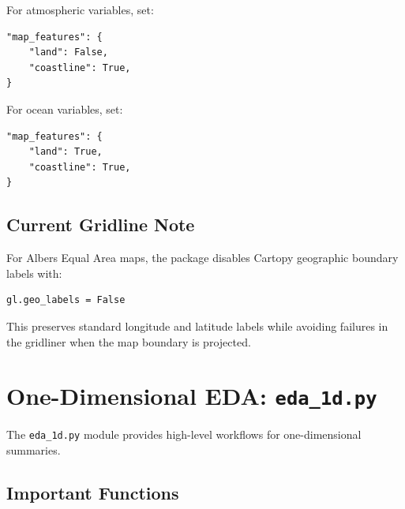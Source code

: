 \documentclass[11pt,a4paper]{article}
\begin{document}
For atmospheric variables, set:

\begin{lstlisting}[style=pythonstyle]
"map_features": {
    "land": False,
    "coastline": True,
}
\end{lstlisting}

For ocean variables, set:

\begin{lstlisting}[style=pythonstyle]
"map_features": {
    "land": True,
    "coastline": True,
}
\end{lstlisting}

\subsection{Current Gridline Note}

For Albers Equal Area maps, the package disables Cartopy geographic boundary labels with:

\begin{lstlisting}[style=pythonstyle]
gl.geo_labels = False
\end{lstlisting}

This preserves standard longitude and latitude labels while avoiding failures in the gridliner when the map boundary is projected.

\section{One-Dimensional EDA: \texttt{eda\_1d.py}}

The \texttt{eda\_1d.py} module provides high-level workflows for one-dimensional summaries.

\subsection{Important Functions}
\end{document}
